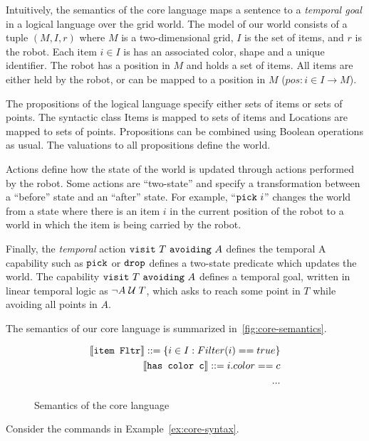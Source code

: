 Intuitively, the semantics of the core language maps a sentence to a \emph{temporal goal}
in a logical language over the grid world.
The model of our world consists of a tuple $(M, I, r)$ where
$M$ is a two-dimensional grid, $I$ is the set of items, and $r$ is the robot.
Each item $i \in I$ is has an associated color, shape and a unique identifier.
The robot has a position in $M$ and holds a set of items. All items are either held by
the robot, or can be mapped to a position in $M$ ($pos: i \in I \to M$).

The propositions of the logical language specify either sets of items or sets of points.
The syntactic class Items is mapped to sets of items and Locations are mapped to sets of points. 
Propositions can be combined using Boolean operations as usual.
The valuations to all propositions define the world.

Actions define how the state of the world is updated through actions performed by the robot.
Some actions are ``two-state'' and specify a transformation between a ``before'' state and an
``after'' state.
For example, ``$\mathtt{pick}\ i$'' changes the world from a state where there is an item $i$ in the
current position of the robot to a world in which the item is being carried by the robot.

Finally, the \emph{temporal} action $\mathtt{visit}\ T\ \mathtt{avoiding}\ A$ defines the temporal
A capability such as $\mathtt{pick}$ or $\mathtt{drop}$ defines a two-state predicate which updates the world.
The capability $\mathtt{visit}\ T\ \mathtt{avoiding}\ A$ defines a temporal goal, written in linear
temporal logic as $\lnot A\; \mathcal{U}\; T$, which asks to reach some point in $T$ while avoiding
all points in $A$. 




The semantics of our core language is summarized in~\autoref{fig:core-semantics}.

\begin{figure}[t]
  \begin{align*}
  \llbracket \texttt{item Fltr}\rrbracket ::= \{i \in I: Filter(i) == true \} \\
  \llbracket \texttt{has color c}\rrbracket ::= i.color == c\\
  ...
  \end{align*}
  \caption{Semantics of the core language}
  \label{fig:core-semantics}
\end{figure}

\begin{example}
%
Consider the commands in Example~\ref{ex:core-syntax}.
\end{example}


